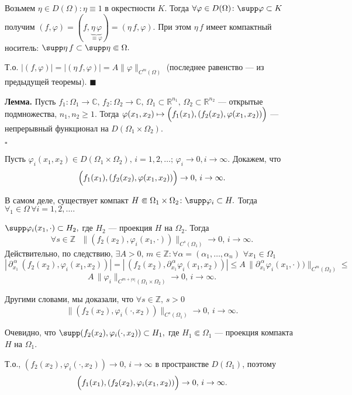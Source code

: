 \documentclass[12pt,a4paper,draft]{article}
\DeclareRobustCommand*{\т}{~--- }
\DeclareRobustCommand*{\ч}{~-- }
\begin{document}
Возьмем $\eta\in D(\Omega)\colon \eta\equiv1$ в окрестности $K$.
Тогда $\forall \varphi\in D(\Omega)\colon \supp \varphi\subset K$
получим
$(f,\varphi)=(f,\underbrace{\eta\,\varphi}_{\equiv\varphi})=(\eta\,f,\varphi).$
При этом $\eta\,f$ имеет компактный носитель: $\supp
\eta\,f\subset \supp \eta\Subset\Omega.$

Т.о.
$|(f,\varphi)|=|(\eta\,f,\varphi)|=A\|\varphi\|_{C^m(\Omega)}$
(последнее равенство --- из предыдущей теоремы). $\blacksquare$

\textbf{Лемма.} Пусть $f_1\colon \Omega_1\to \mathbb C,\,f_2\colon
\Omega_2\to \mathbb C,\,\Omega_1\subset\mathbb
R^{n_1},\,\Omega_2\subset\mathbb R^{n_2}$ --- открытые
подмножества, $n_1,n_2\ge1.$ Тогда $\varphi(x_1,x_2)\mapsto
\Bigl(f_1(x_1),(f_2(x_2),\varphi(x_1,x_2))\Bigr)$ --- непрерывный
функционал на $D(\Omega_1\times\Omega_2).$

$\square$

Пусть $\varphi_i(x_1,x_2)\in
D(\Omega_1\times\Omega_2),\,i=1,2,\ldots;\, \varphi_i\to0,
i\to{\infty}.$ Докажем, что
$$\Bigl(f_1(x_1),(f_2(x_2),\varphi(x_1,x_2))\Bigr)\to0,\,i\to{\infty}.$$

В самом деле, существует компакт
$H\Subset\Omega_1\times\Omega_2\colon \supp \varphi_i\subset H.$
Тогда $\forall _1\in\Omega\,\forall i=1,2,\ldots.$

$\supp \varphi_i(x_1,\cdot)\subset H_2,$ где $H_2$ --- проекция
$H$ на $\Omega_2.$ Тогда
$$\forall s\in \mathbb Z\,\,\,\,
\|(f_2(x_2),\varphi_i(x_1,\cdot))\|_{C^s(\Omega_1)}\to0,\,i\to{\infty}.$$
Действительно, по следствию, $\exists A>0,\,m\in \mathbb Z\colon
\forall \alpha=(\alpha_1,\ldots,\alpha_n) \,\,\forall
x_1\in\Omega_1$
$$|\,\partial^{\,\alpha}_{x_1}\,(f_2(x_2),\varphi_i(x_1,x_2))|=
|\,(f_2(x_2),\partial^{\,\alpha}_{x_1}\varphi_i(x_1,x_2))|\le
A\,\|\partial^{\,\alpha}_{x_1}\varphi_i(x_1,\cdot))\|_{C^m(\Omega_2)}\le$$
$$A\,\|\varphi_i\|_{C^{m+|\alpha|}(\Omega_1\times\Omega_2)}\to0,\,i\to{\infty}.$$

Другими словами, мы доказали, что $\forall s\in \mathbb Z,\,s>0$
$$\|(f_2(x_2),\varphi_i(\cdot,x_2))\|_{C^s(\Omega_1)}\to0,\,i\to{\infty}.$$

Очевидно, что $\supp (f_2(x_2),\varphi_i(\cdot,x_2))\subset H_1,$
где $H_1\Subset\Omega_1$ --- проекция компакта $H$ на $\Omega_1.$

Т.о., $(f_2(x_2),\varphi_i(\cdot,x_2))\to0,\,i\to{\infty}$ в
пространстве $D(\Omega_1)$, поэтому
$$\Bigl(f_1(x_1),(f_2(x_2),\varphi_i(x_1,x_2))\Bigr)\to0,\,i\to{\infty}.$$
\end{document}
